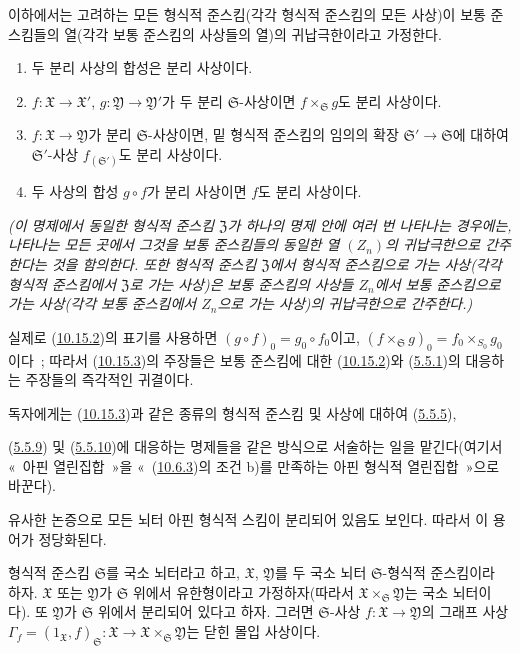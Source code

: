 \begin{proposition}[10.15.3]
\label{I.10.15.3-ko}
이하에서는 고려하는 모든 형식적 준스킴(각각 형식적 준스킴의 모든 사상)이
보통 준스킴들의 열(각각 보통 준스킴의 사상들의 열)의 귀납극한이라고
가정한다.
\begin{enumerate}
  \item[\rm{(i)}] 두 분리 사상의 합성은 분리 사상이다.
  \item[\rm{(ii)}] $f:\mathfrak{X}\to\mathfrak{X}'$,
  $g:\mathfrak{Y}\to\mathfrak{Y}'$가 두 분리
  $\mathfrak{S}$-사상이면 $f\times_{\mathfrak{S}}g$도 분리 사상이다.
  \item[\rm{(iii)}] $f:\mathfrak{X}\to\mathfrak{Y}$가 분리
  $\mathfrak{S}$-사상이면, 밑 형식적 준스킴의 임의의 확장
  $\mathfrak{S}'\to\mathfrak{S}$에 대하여 $\mathfrak{S}'$-사상
  $f_{(\mathfrak{S}')}$도 분리 사상이다.
  \item[\rm{(iv)}] 두 사상의 합성 $g\circ f$가 분리 사상이면 $f$도 분리
  사상이다.
\end{enumerate}
\emph{(이 명제에서 동일한 형식적 준스킴 $\mathfrak{Z}$가 하나의 명제 안에
여러 번 나타나는 경우에는, 나타나는 모든 곳에서 그것을 보통 준스킴들의
동일한 열 $(Z_n)$의 귀납극한으로 간주한다는 것을 함의한다. 또한
형식적 준스킴 $\mathfrak{Z}$에서 형식적 준스킴으로 가는 사상(각각 형식적
준스킴에서 $\mathfrak{Z}$로 가는 사상)은 보통 준스킴의 사상들
 $Z_n$에서 보통 준스킴으로 가는 사상(각각 보통 준스킴에서 $Z_n$으로
가는 사상)의 귀납극한으로 간주한다.)}
\end{proposition}

실제로 (\hyperref[I.10.15.2-ko]{10.15.2})의 표기를 사용하면
$(g\circ f)_0=g_0\circ f_0$이고,
$(f\times_{\mathfrak{S}}g)_0=f_0\times_{S_0}g_0$이다~; 따라서
(\hyperref[I.10.15.3-ko]{10.15.3})의 주장들은 보통 준스킴에 대한
(\hyperref[I.10.15.2-ko]{10.15.2})와
(\hyperref[I.5.5.1-ko]{5.5.1})의 대응하는 주장들의 즉각적인
귀결이다.

독자에게는 (\hyperref[I.10.15.3-ko]{10.15.3})과 같은 종류의 형식적
준스킴 및 사상에 대하여
(\hyperref[I.5.5.5-ko]{5.5.5}),

(\hyperref[I.5.5.9-ko]{5.5.9}) 및
(\hyperref[I.5.5.10-ko]{5.5.10})에 대응하는 명제들을 같은 방식으로
서술하는 일을 맡긴다(여기서 «~아핀 열린집합~»을
«~(\hyperref[I.10.6.3-ko]{10.6.3})의 조건 b)를 만족하는 아핀 형식적
열린집합~»으로 바꾼다).

유사한 논증으로 모든 뇌터 아핀 형식적 스킴이 분리되어 있음도 보인다.
따라서 이 용어가 정당화된다.

\begin{proposition}[10.15.4]
\label{I.10.15.4-ko}
형식적 준스킴 $\mathfrak{S}$를 국소 뇌터라고 하고,
$\mathfrak{X}$, $\mathfrak{Y}$를 두 국소 뇌터
$\mathfrak{S}$-형식적 준스킴이라 하자. $\mathfrak{X}$ 또는
$\mathfrak{Y}$가 $\mathfrak{S}$ 위에서 유한형이라고 가정하자(따라서
$\mathfrak{X}\times_{\mathfrak{S}}\mathfrak{Y}$는 국소 뇌터이다).
또 $\mathfrak{Y}$가 $\mathfrak{S}$ 위에서 분리되어 있다고 하자. 그러면
$\mathfrak{S}$-사상 $f:\mathfrak{X}\to\mathfrak{Y}$의 그래프 사상
$\Gamma_f=(1_{\mathfrak{X}},f)_{\mathfrak{S}}:\mathfrak{X}\to
\mathfrak{X}\times_{\mathfrak{S}}\mathfrak{Y}$는 닫힌 몰입 사상이다.
\end{proposition}

